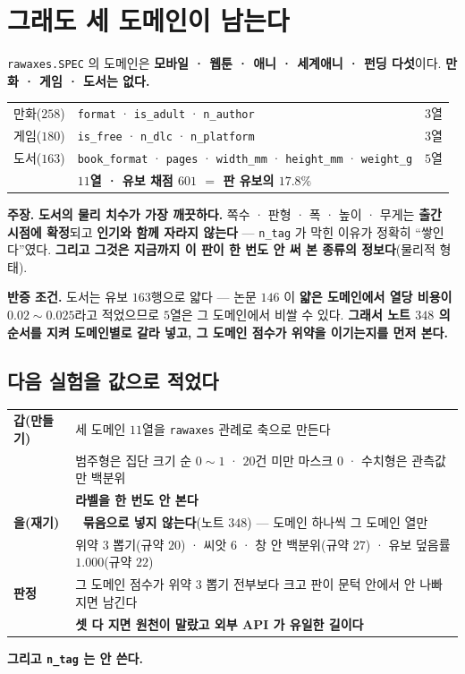 \documentclass[10pt,a4paper]{article}
\newcommand{\claim}[2]{\begin{claimbox}\textbf{주장.} #1\par\smallskip
  \textcolor{gray!70}{\textbf{반증 조건.} #2}\end{claimbox}}
\begin{document}
\section{그래도 세 도메인이 남는다}

\texttt{rawaxes.SPEC} 의 도메인은 \textbf{모바일 · 웹툰 · 애니 · 세계애니 · 펀딩
다섯}이다. \textbf{만화 · 게임 · 도서는 없다.}

\begin{center}
\begin{tabular}{lll}
\toprule
만화($258$) & \texttt{format} · \texttt{is\_adult} · \texttt{n\_author} & $3$열 \\
게임($180$) & \texttt{is\_free} · \texttt{n\_dlc} · \texttt{n\_platform} & $3$열 \\
도서($163$) & \texttt{book\_format} · \texttt{pages} · \texttt{width\_mm} · \texttt{height\_mm} · \texttt{weight\_g} & $5$열 \\
\midrule
& \textbf{$11$열 · 유보 채점 $601$ $=$ 판 유보의 $17.8\%$} & \\
\bottomrule
\end{tabular}
\end{center}

\claim{\textbf{도서의 물리 치수가 가장 깨끗하다.} 쪽수 · 판형 · 폭 · 높이 · 무게는
\textbf{출간 시점에 확정}되고 \textbf{인기와 함께 자라지 않는다} ---
\texttt{n\_tag} 가 막힌 이유가 정확히 ``쌓인다''였다. \textbf{그리고 그것은 지금까지 이
판이 한 번도 안 써 본 종류의 정보다}(물리적 형태).}
{도서는 유보 $163$행으로 얇다 --- 논문 $146$ 이 \textbf{얇은 도메인에서 열당 비용이
$0.02{\sim}0.025$}라고 적었으므로 $5$열은 그 도메인에서 비쌀 수 있다. \textbf{그래서
노트 $348$ 의 순서를 지켜 도메인별로 갈라 넣고, 그 도메인 점수가 위약을 이기는지를
먼저 본다.}}

\subsection*{다음 실험을 값으로 적었다}

\begin{center}
\begin{tabular}{ll}
\toprule
\textbf{갑(만들기)} & 세 도메인 $11$열을 \texttt{rawaxes} 관례로 축으로 만든다 \\
& 범주형은 집단 크기 순 $0{\sim}1$ · $20$건 미만 마스크 $0$ · 수치형은 관측값만 백분위 \\
& \textbf{라벨을 한 번도 안 본다} \\
\midrule
\textbf{을(재기)} & 🔴 \textbf{묶음으로 넣지 않는다}(노트 $348$) --- 도메인 하나씩 그 도메인 열만 \\
& 위약 $3$ 뽑기(규약 $20$) · 씨앗 $6$ · 창 안 백분위(규약 $27$) · 유보 덮음률 $1.000$(규약 $22$) \\
\midrule
\textbf{판정} & 그 도메인 점수가 위약 $3$ 뽑기 전부보다 크고 판이 문턱 안에서 안 나빠지면 남긴다 \\
& \textbf{셋 다 지면 원천이 말랐고 외부 API 가 유일한 길이다} \\
\bottomrule
\end{tabular}
\end{center}

\textbf{그리고 \texttt{n\_tag} 는 안 쓴다.}
\end{document}

